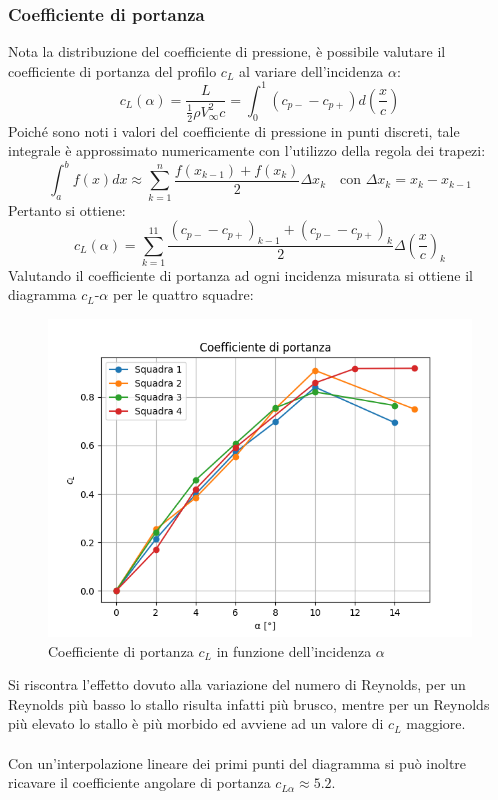 \newpage
\subsubsection{Coefficiente di portanza}
Nota la distribuzione del coefficiente di pressione, è possibile valutare il coefficiente di portanza del profilo $c_L$ al variare dell'incidenza $\alpha$:
\begin{equation*}
    c_L(\alpha) = \frac{L}{\frac12 \rho V_\infty^2 c} = \int_0^1 (c_{p-}-c_{p+})d\left( \frac xc \right)
\end{equation*}  
Poiché sono noti i valori del coefficiente di pressione in punti discreti, tale integrale è approssimato numericamente con l'utilizzo della regola dei trapezi:
\begin{equation*}
    \int_a^b f(x)dx \approx \sum_{k=1}^n \frac{f(x_{k-1}) + f(x_k)}2 \Delta x_k \quad \text{con } \Delta x_k = x_k - x_{k-1}
\end{equation*}
Pertanto si ottiene:
\begin{equation*}
    c_L(\alpha) = \sum_{k=1}^{11} \frac{(c_{p-}-c_{p+})_{k-1}+(c_{p-}-c_{p+})_k}2 \Delta \left( \frac xc \right)_k
\end{equation*}
Valutando il coefficiente di portanza ad ogni incidenza misurata si ottiene il diagramma $c_L$-$\alpha$ per le quattro squadre:
\begin{figure}[H]
    \centering
    \includegraphics[width=.75\textwidth]{images/5/cl.png}
    \caption{Coefficiente di portanza $c_L$ in funzione dell'incidenza $\alpha$}
\end{figure}

\noindent Si riscontra l'effetto dovuto alla variazione del numero di Reynolds, per un Reynolds più basso lo stallo risulta infatti più brusco, mentre per un Reynolds più elevato lo stallo è più morbido ed avviene ad un valore di $c_L$ maggiore.\\\\
Con un'interpolazione lineare dei primi punti del diagramma si può inoltre ricavare il coefficiente angolare di portanza $c_{L\alpha}\approx5.2$.

